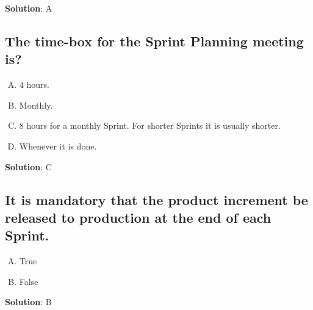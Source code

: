 \textbf{Solution}: A


\subsection{The time-box for the Sprint Planning meeting is?}
\begin{enumerate}[A)]
  \item 4 hours.
  \item Monthly.
  \item 8 hours for a monthly Sprint. For shorter Sprints it is usually shorter.
  \item Whenever it is done.
\end{enumerate}


\textbf{Solution}: C


\subsection{It is mandatory that the product increment be released to production at the end of each Sprint.}


\begin{enumerate}[A)]
  \item True
  \item False
\end{enumerate}


\textbf{Solution}: B
\pagebreak



